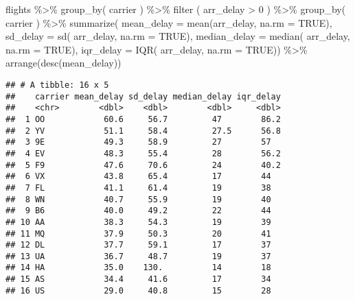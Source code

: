 \documentclass[
]{article}
\newenvironment{Shaded}{\begin{snugshade}}{\end{snugshade}}
\newcommand{\AttributeTok}[1]{\textcolor[rgb]{0.77,0.63,0.00}{#1}}
\newcommand{\ConstantTok}[1]{\textcolor[rgb]{0.00,0.00,0.00}{#1}}
\newcommand{\DecValTok}[1]{\textcolor[rgb]{0.00,0.00,0.81}{#1}}
\newcommand{\FunctionTok}[1]{\textcolor[rgb]{0.00,0.00,0.00}{#1}}
\newcommand{\NormalTok}[1]{#1}
\newcommand{\SpecialCharTok}[1]{\textcolor[rgb]{0.00,0.00,0.00}{#1}}
\begin{document}
\begin{Shaded}
\begin{Highlighting}[]
\NormalTok{flights }\SpecialCharTok{\%\textgreater{}\%}
  \FunctionTok{group\_by}\NormalTok{( carrier ) }\SpecialCharTok{\%\textgreater{}\%}
  \FunctionTok{filter}\NormalTok{ ( arr\_delay }\SpecialCharTok{\textgreater{}} \DecValTok{0}\NormalTok{ ) }\SpecialCharTok{\%\textgreater{}\%} 
  \FunctionTok{group\_by}\NormalTok{( carrier ) }\SpecialCharTok{\%\textgreater{}\%} 
  \FunctionTok{summarize}\NormalTok{( }\AttributeTok{mean\_delay =} \FunctionTok{mean}\NormalTok{(arr\_delay, }\AttributeTok{na.rm =} \ConstantTok{TRUE}\NormalTok{),}
             \AttributeTok{sd\_delay =} \FunctionTok{sd}\NormalTok{( arr\_delay, }\AttributeTok{na.rm =} \ConstantTok{TRUE}\NormalTok{),}
             \AttributeTok{median\_delay =} \FunctionTok{median}\NormalTok{( arr\_delay, }\AttributeTok{na.rm =} \ConstantTok{TRUE}\NormalTok{),}
             \AttributeTok{iqr\_delay =} \FunctionTok{IQR}\NormalTok{( arr\_delay, }\AttributeTok{na.rm =} \ConstantTok{TRUE}\NormalTok{)) }\SpecialCharTok{\%\textgreater{}\%} 
  \FunctionTok{arrange}\NormalTok{(}\FunctionTok{desc}\NormalTok{(mean\_delay))}
\end{Highlighting}
\end{Shaded}

\begin{verbatim}
## # A tibble: 16 x 5
##    carrier mean_delay sd_delay median_delay iqr_delay
##    <chr>        <dbl>    <dbl>        <dbl>     <dbl>
##  1 OO            60.6     56.7         47        86.2
##  2 YV            51.1     58.4         27.5      56.8
##  3 9E            49.3     58.9         27        57  
##  4 EV            48.3     55.4         28        56.2
##  5 F9            47.6     70.6         24        40.2
##  6 VX            43.8     65.4         17        44  
##  7 FL            41.1     61.4         19        38  
##  8 WN            40.7     55.9         19        40  
##  9 B6            40.0     49.2         22        44  
## 10 AA            38.3     54.3         19        39  
## 11 MQ            37.9     50.3         20        41  
## 12 DL            37.7     59.1         17        37  
## 13 UA            36.7     48.7         19        37  
## 14 HA            35.0    130.          14        18  
## 15 AS            34.4     41.6         17        34  
## 16 US            29.0     40.8         15        28
\end{verbatim}
\end{document}
